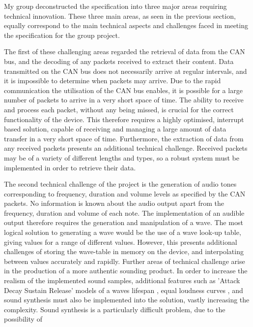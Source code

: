 My group deconstructed the specification into three major areas requiring 
technical innovation. 
These three main areas, as seen in the previous section, 
equally correspond to the main technical aspects and challenges faced in 
meeting the specification for the group project. 
\par\bigskip\noindent
The first of these challenging areas regarded the retrieval of data from the CAN 
bus, and the decoding of any packets received to extract their content. 
Data transmitted on the CAN bus does not necessarily arrive at regular intervals, 
and it is impossible to determine when packets may arrive.
Due to the rapid communication the utilisation of the CAN bus enables, it is 
possible for a large number of packets to arrive in a very short space of time.
The ability to receive and process each packet, without any being missed, is 
crucial for the correct functionality of the device. 
This therefore requires a highly optimised, interrupt based solution, capable of
receiving and managing a large amount of data transfer in a very short space of
time. 
Furthermore, the extraction of data from any received packets presents an 
additional technical challenge. 
Received packets may be of a variety of different lengths and types, so a robust 
system must be implemented in order to retrieve their data. 
\par\bigskip\noindent
The second technical challenge of the project is the generation of audio tones 
corresponding to frequency, duration and volume levels as specified by the CAN 
packets. 
No information is known about the audio output  apart from the frequency, 
duration and volume of each note. 
The implementation of an audible output therefore requires the generation and 
manipulation of a wave. 
The most logical solution to generating a wave would be the use of a wave look-up 
table, giving values for a range of different values. 
However, this presents additional challenges of storing the wave-table in memory 
on the device, and interpolating between values accurately and rapidly. 
Further areas of technical challenge arise in the production of a more authentic 
sounding product. 
In order to increase the realism of the implemented sound samples, additional 
features such as 'Attack Decay 
Sustain Release' models of a waves lifespan \cite{asr-book}, equal loudness 
curves \cite{kefauver2001audio}, and sound synthesis \cite{miranda2012computer} 
must also be implemented into the solution, vastly increasing the complexity. 
Sound synthesis is a particularly difficult problem, due to the possibility of 
